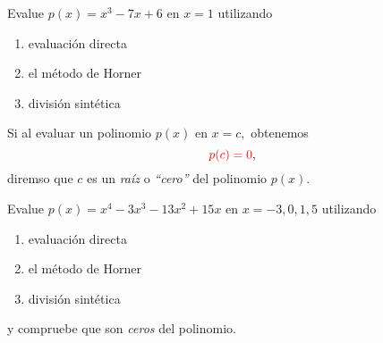 	\begin{problema}
		Evalue $p(x)=x^{3}-7x+6$ en $x=1$ utilizando
		\begin{enumerate}
			\item evaluaci\'on directa 
			\item el m\'etodo de Horner 
			\item divisi\'on sint\'etica
		\end{enumerate} 
	\end{problema}



	\begin{defn}
		Si al evaluar un polinomio $p(x)$ en $x=c,$ obtenemos 
		$$
		{\color{red} p(c)=0},
		$$
		diremso que $c$ es un \emph{ra\'iz} o \emph{``cero''} del polinomio $p(x).$
	\end{defn}



	\begin{problema}
		Evalue $p(x)=x^{4}-3x^{3}-13x^{2}+15x$ en $x=-3,0,1,5$ utilizando
		\begin{enumerate}
			\item evaluaci\'on directa 
			\item el m\'etodo de Horner 
			\item divisi\'on sint\'etica
		\end{enumerate} 
	\end{problema} y compruebe que son \emph{ceros} del polinomio.

